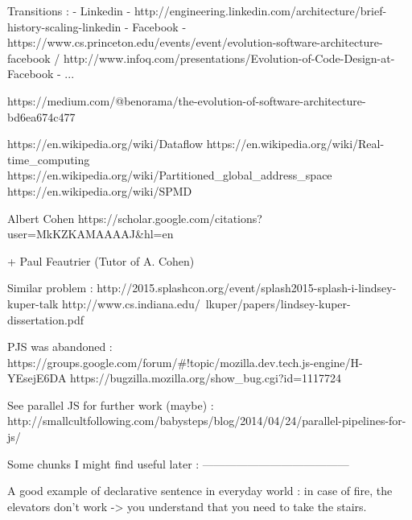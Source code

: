 Transitions :
  - Linkedin - http://engineering.linkedin.com/architecture/brief-history-scaling-linkedin
  - Facebook - https://www.cs.princeton.edu/events/event/evolution-software-architecture-facebook / http://www.infoq.com/presentations/Evolution-of-Code-Design-at-Facebook
  - ... 

https://medium.com/@benorama/the-evolution-of-software-architecture-bd6ea674c477

https://en.wikipedia.org/wiki/Dataflow
https://en.wikipedia.org/wiki/Real-time_computing
https://en.wikipedia.org/wiki/Partitioned_global_address_space
https://en.wikipedia.org/wiki/SPMD

Albert Cohen
https://scholar.google.com/citations?user=MkKZKAMAAAAJ&hl=en

+ Paul Feautrier (Tutor of A. Cohen)


Similar problem :
http://2015.splashcon.org/event/splash2015-splash-i-lindsey-kuper-talk
http://www.cs.indiana.edu/~lkuper/papers/lindsey-kuper-dissertation.pdf

PJS was abandoned :
https://groups.google.com/forum/#!topic/mozilla.dev.tech.js-engine/H-YEsejE6DA
https://bugzilla.mozilla.org/show_bug.cgi?id=1117724

See parallel JS for further work (maybe) :
http://smallcultfollowing.com/babysteps/blog/2014/04/24/parallel-pipelines-for-js/

Some chunks I might find useful later :
---------------------------------------

A good example of declarative sentence in everyday world : in case of fire, 
the elevators don't work -> you understand that you need to take the stairs.